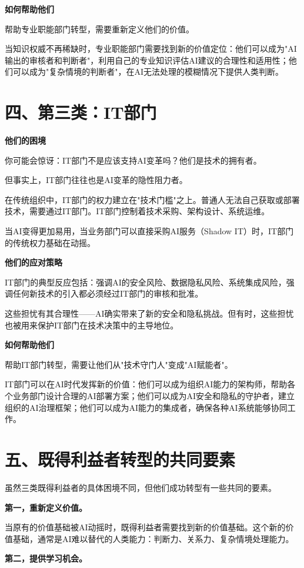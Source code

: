 \textbf{如何帮助他们}

帮助专业职能部门转型，需要重新定义他们的价值。

当知识权威不再稀缺时，专业职能部门需要找到新的价值定位：他们可以成为"AI输出的审核者和判断者"，利用自己的专业知识评估AI建议的合理性和适用性；他们可以成为"复杂情境的判断者"，在AI无法处理的模糊情况下提供人类判断。

\section{四、第三类：IT部门}


\textbf{他们的困境}

你可能会惊讶：IT部门不是应该支持AI变革吗？他们是技术的拥有者。

但事实上，IT部门往往也是AI变革的隐性阻力者。

在传统组织中，IT部门的权力建立在"技术门槛"之上。普通人无法自己获取或部署技术，需要通过IT部门。IT部门控制着技术采购、架构设计、系统运维。

当AI变得更加易用，当业务部门可以直接采购AI服务（Shadow IT）时，IT部门的传统权力基础在动摇。

\textbf{他们的应对策略}

IT部门的典型反应包括：强调AI的安全风险、数据隐私风险、系统集成风险，强调任何新技术的引入都必须经过IT部门的审核和批准。

这些担忧有其合理性——AI确实带来了新的安全和隐私挑战。但有时，这些担忧也被用来保护IT部门在技术决策中的主导地位。

\textbf{如何帮助他们}

帮助IT部门转型，需要让他们从"技术守门人"变成"AI赋能者"。

IT部门可以在AI时代发挥新的价值：他们可以成为组织AI能力的架构师，帮助各个业务部门设计合理的AI部署方案；他们可以成为AI安全和隐私的守护者，建立组织的AI治理框架；他们可以成为AI能力的集成者，确保各种AI系统能够协同工作。

\section{五、既得利益者转型的共同要素}


虽然三类既得利益者的具体困境不同，但他们成功转型有一些共同的要素。

\textbf{第一，重新定义价值。}

当原有的价值基础被AI动摇时，既得利益者需要找到新的价值基础。这个新的价值基础，通常是AI难以替代的人类能力：判断力、关系力、复杂情境处理能力。

\textbf{第二，提供学习机会。}

